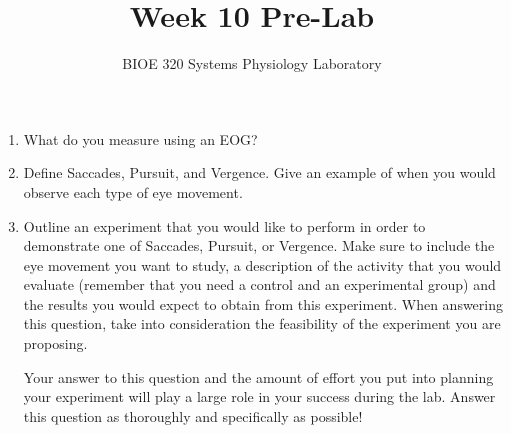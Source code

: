 \documentclass{article}
\title{Week 10 Pre-Lab}
\author{BIOE 320 Systems Physiology Laboratory}
\date{}
\begin{document}
\maketitle
\large

\begin{enumerate}
	\item What do you measure using an EOG?
	\item Define Saccades, Pursuit, and Vergence. Give an example of when you would observe each type of eye movement.
	\item Outline an experiment that you would like to perform in order to demonstrate one of Saccades, Pursuit, or Vergence. Make sure to include the eye movement you want to study, a description of the activity that you would evaluate (remember that you need a control and an experimental group) and the results you would expect to obtain from this experiment. When answering this question, take into consideration the feasibility of the experiment you are proposing.
	\begin{info}
	Your answer to this question and the amount of effort you put into planning your experiment will play a large role in your success during the lab. Answer this question as thoroughly and specifically as possible!	
	\end{info}

\end{enumerate}
\end{document}
